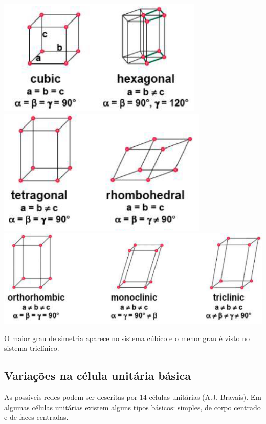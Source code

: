 \includegraphics[scale=0.5,trim={0 0 0 0}]{figures/crist1}
\includegraphics[scale=0.5,trim={0 0 0 0}]{figures/crist2}
\includegraphics[scale=0.3,trim={0 0 0 0}]{figures/crist3}


O maior grau de simetria aparece no sistema cúbico e o menor grau é visto no sistema triclínico.

\subsection*{Variações na célula unitária básica}

As possíveis redes podem ser descritas por 14 células unitárias (A.J. Bravais).
Em algumas células unitárias existem alguns tipos básicos: simples, de corpo centrado e de faces centradas.
 
